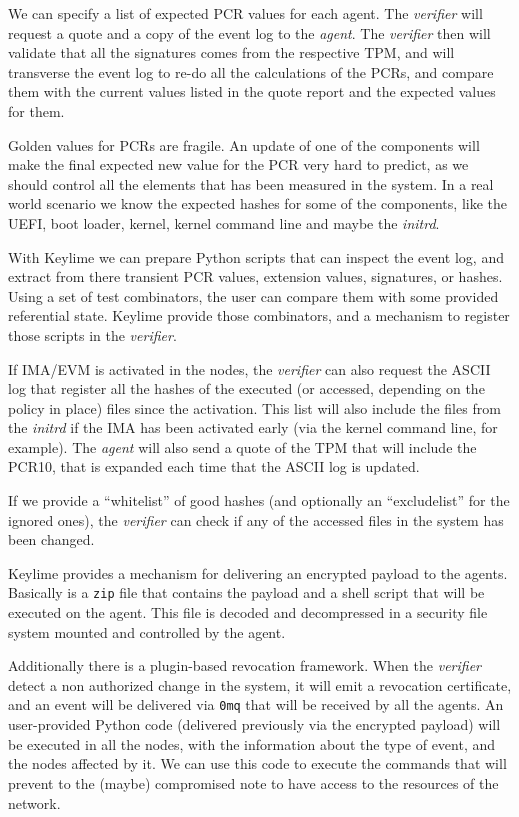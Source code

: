 \documentclass{article}
\begin{document}
We can specify a list of expected PCR values for each agent.  The
\emph{verifier} will request a quote and a copy of the event log to
the \emph{agent}.  The \emph{verifier} then will validate that all the
signatures comes from the respective TPM, and will transverse the
event log to re-do all the calculations of the PCRs, and compare them
with the current values listed in the quote report and the expected
values for them.

Golden values for PCRs are fragile.  An update of one of the
components will make the final expected new value for the PCR very
hard to predict, as we should control all the elements that has been
measured in the system.  In a real world scenario we know the expected
hashes for some of the components, like the UEFI, boot loader, kernel,
kernel command line and maybe the \emph{initrd}.

With Keylime we can prepare Python scripts that can inspect the event
log, and extract from there transient PCR values, extension values,
signatures, or hashes.  Using a set of test combinators, the user can
compare them with some provided referential state.  Keylime provide
those combinators, and a mechanism to register those scripts in the
\emph{verifier}.

If IMA/EVM is activated in the nodes, the \emph{verifier} can also
request the ASCII log that register all the hashes of the executed (or
accessed, depending on the policy in place) files since the
activation.  This list will also include the files from the
\emph{initrd} if the IMA has been activated early (via the kernel
command line, for example).  The \emph{agent} will also send a quote
of the TPM that will include the PCR10, that is expanded each time
that the ASCII log is updated.

If we provide a ``whitelist'' of good hashes (and optionally an
``excludelist'' for the ignored ones), the \emph{verifier} can check
if any of the accessed files in the system has been changed.

Keylime provides a mechanism for delivering an encrypted payload to
the agents.  Basically is a \texttt{zip} file that contains the
payload and a shell script that will be executed on the agent.  This
file is decoded and decompressed in a security file system mounted and
controlled by the agent.

Additionally there is a plugin-based revocation framework.  When the
\emph{verifier} detect a non authorized change in the system, it will
emit a revocation certificate, and an event will be delivered via
\texttt{0mq} that will be received by all the agents.  An
user-provided Python code (delivered previously via the encrypted
payload) will be executed in all the nodes, with the information about
the type of event, and the nodes affected by it.  We can use this code
to execute the commands that will prevent to the (maybe) compromised
note to have access to the resources of the network.
\end{document}
